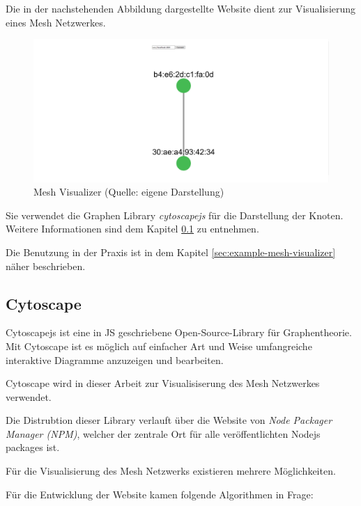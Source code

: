 Die in der nachstehenden Abbildung dargestellte Website dient zur Visualisierung eines Mesh Netzwerkes. 

\begin{figure}[H] \begin{center}
        \includegraphics[scale=0.3]{images/example_result_mesh_visualizer.png}
        \caption{Mesh Visualizer (Quelle: eigene Darstellung)}
        \label{abb:mesh_visualizer}
    \end{center}    
\end{figure}

Sie verwendet die Graphen Library \textit{cytoscapejs} für die Darstellung der Knoten. Weitere Informationen sind dem Kapitel \ref{sec:cytoscape} zu entnehmen. 

Die Benutzung in der Praxis ist in dem Kapitel \ref{sec:example-mesh-visualizer} näher beschrieben.

\subsection{Cytoscape}\label{sec:cytoscape}

Cytoscapejs ist eine in JS geschriebene Open-Source-Library für Graphentheorie.
Mit Cytoscape ist es möglich auf einfacher Art und Weise umfangreiche interaktive Diagramme anzuzeigen und bearbeiten. \cite{cytoscape_intro}

Cytoscape wird in dieser Arbeit zur Visualisiserung des Mesh Netzwerkes verwendet.

Die Distrubtion dieser Library verlauft über die Website von \textit{Node Packager Manager (NPM)}, welcher der zentrale Ort für alle veröffentlichten Nodejs packages ist.

Für die Visualisierung des Mesh Netzwerks existieren mehrere Möglichkeiten.

Für die Entwicklung der Website kamen folgende Algorithmen in Frage:


